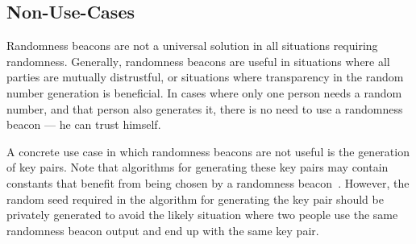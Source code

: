 \subsection{Non-Use-Cases}\label{sub:non_use_cases}
Randomness beacons are not a universal solution in all situations requiring randomness. Generally‚ randomness beacons are useful in situations where all parties are mutually distrustful, or situations where transparency in the random number generation is beneficial. In cases where only one person needs a random number, and that person also generates it, there is no need to use a randomness beacon --- he can trust himself.

A concrete use case in which randomness beacons are not useful is the generation of key pairs. Note that algorithms for generating these key pairs may contain constants that benefit from being chosen by a randomness beacon~\cite{baigneres2015trap}. However, the random seed required in the algorithm for generating the key pair should be privately generated to avoid the likely situation where two people use the same randomness beacon output and end up with the same key pair. 

